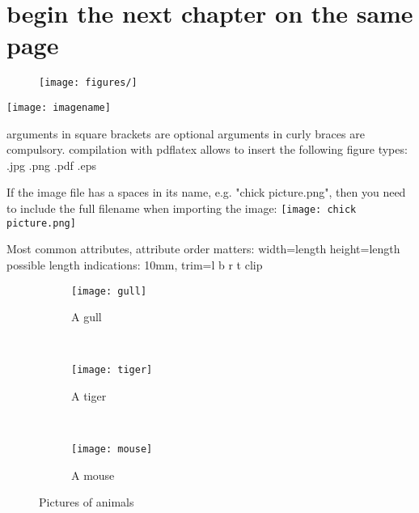 \chapter{begin the next chapter on the same page}

\endgroup




\begin{figure}[H]
  \begin{center}
    \texttt{[image: figures/]}
  \end{center}
  \caption{}
  \label{fig:}
\end{figure}


\texttt{[image: imagename]}

arguments in square brackets are optional
arguments in curly braces are compulsory.
compilation with pdflatex allows to insert the following figure types: .jpg .png .pdf .eps

If the image file has a spaces in its name, e.g. "chick picture.png", then you need to include the full filename when importing the image:
\texttt{[image: chick picture.png]}

Most common attributes, attribute order matters:
width=length
height=length
possible length indications: 10mm, \linewidth \textwidth \textheight
trim=l b r t    %
clip          	%



\begin{figure}
        \centering
        \begin{subfigure}[b]{0.3\textwidth}
                \texttt{[image: gull]}
                \caption{A gull}
                \label{fig:gull}
        \end{subfigure}%
        ~ %
        \begin{subfigure}[b]{0.3\textwidth}
                \texttt{[image: tiger]}
                \caption{A tiger}
                \label{fig:tiger}
        \end{subfigure}
        ~ %
        \begin{subfigure}[b]{0.3\textwidth}
                \texttt{[image: mouse]}
                \caption{A mouse}
                \label{fig:mouse}
        \end{subfigure}
        \caption{Pictures of animals}\label{fig:animals}
\end{figure}


